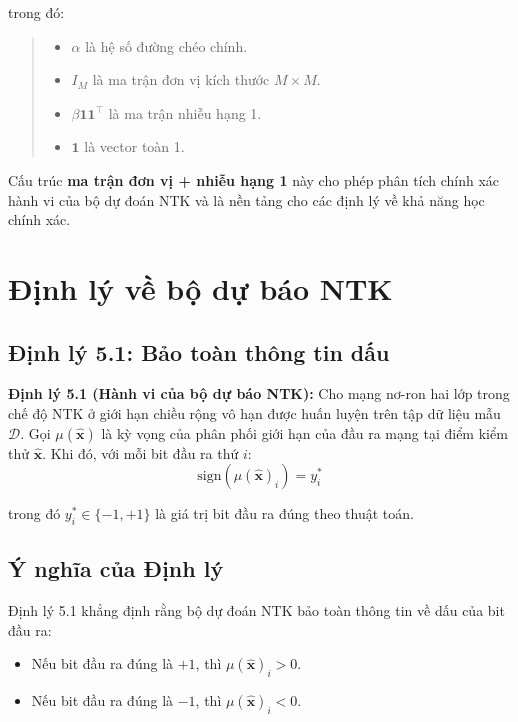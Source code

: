 trong đó:
\begin{quote}
\begin{itemize}
    \item $\alpha$ là hệ số đường chéo chính.
    \item $I_M$ là ma trận đơn vị kích thước $M \times M$.
    \item $\beta \mathbf{1}\mathbf{1}^\top$ là ma trận nhiễu hạng 1.
    \item $\mathbf{1}$ là vector toàn 1.
\end{itemize}
\end{quote}

Cấu trúc \textbf{ma trận đơn vị + nhiễu hạng 1} này cho phép phân tích chính xác hành vi của bộ dự đoán NTK và là nền tảng cho các định lý về khả năng học chính xác.

\section{Định lý về bộ dự báo NTK}

\subsection{Định lý 5.1: Bảo toàn thông tin dấu}

    	\textbf{Định lý 5.1 (Hành vi của bộ dự báo NTK):} Cho mạng nơ-ron hai lớp trong chế độ NTK ở giới hạn chiều rộng vô hạn được huấn luyện trên tập dữ liệu mẫu $\mathcal{D}$. Gọi $\mu(\hat{\mathbf{x}})$ là kỳ vọng của phân phối giới hạn của đầu ra mạng tại điểm kiểm thử $\hat{\mathbf{x}}$. Khi đó, với mỗi bit đầu ra thứ $i$:
\begin{equation}
    \text{sign}(\mu(\hat{\mathbf{x}})_i) = y_i^*
\end{equation}

trong đó $y_i^* \in \{-1, +1\}$ là giá trị bit đầu ra đúng theo thuật toán.

\subsection{Ý nghĩa của Định lý}

Định lý 5.1 khẳng định rằng bộ dự đoán NTK bảo toàn thông tin về dấu của bit đầu ra:
\begin{itemize}
    \item Nếu bit đầu ra đúng là $+1$, thì $\mu(\hat{\mathbf{x}})_i > 0$.
    \item Nếu bit đầu ra đúng là $-1$, thì $\mu(\hat{\mathbf{x}})_i < 0$.
\end{itemize}

